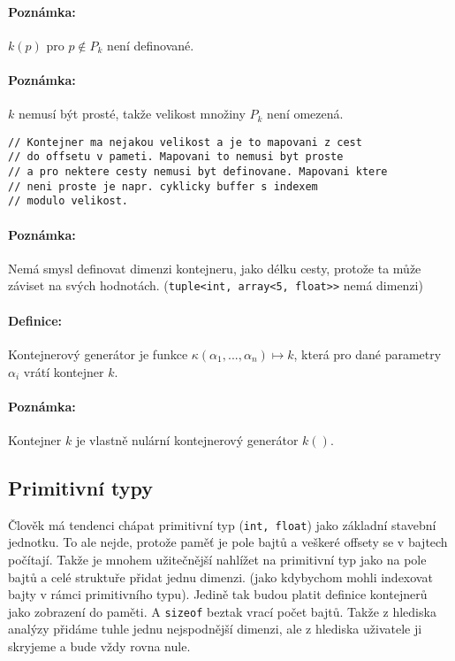 \documentclass[a4paper,12pt]{article}
\begin{document}
\paragraph{Poznámka:} $k(p)$ \qquad pro $p \notin P_k$ není definované.

\paragraph{Poznámka:} $k$ nemusí být prosté, takže velikost množiny $P_k$ není omezená.

\begin{lstlisting}
// Kontejner ma nejakou velikost a je to mapovani z cest
// do offsetu v pameti. Mapovani to nemusi byt proste
// a pro nektere cesty nemusi byt definovane. Mapovani ktere
// neni proste je napr. cyklicky buffer s indexem
// modulo velikost.
\end{lstlisting}

\paragraph{Poznámka:} Nemá smysl definovat dimenzi kontejneru, jako délku cesty, protože ta může záviset na svých hodnotách. (\lstinline{tuple<int, array<5, float>>} nemá dimenzi)

\paragraph{Definice:} Kontejnerový generátor je funkce $\kappa(\alpha_1, ..., \alpha_n) \mapsto k$, která pro dané parametry $\alpha_i$ vrátí kontejner $k$.

\paragraph{Poznámka:} Kontejner $k$ je vlastně nulární kontejnerový generátor $k()$.


\subsection{Primitivní typy}

Člověk má tendenci chápat primitivní typ (\lstinline{int, float}) jako základní stavební jednotku.
To ale nejde, protože paměť je pole bajtů a veškeré offsety se v bajtech počítají. Takže je mnohem
užitečnější nahlížet na primitivní typ jako na pole bajtů a celé struktuře přidat jednu dimenzi.
(jako kdybychom mohli indexovat bajty v rámci primitivního typu). Jedině tak budou platit definice
kontejnerů jako zobrazení do paměti. A \lstinline{sizeof} beztak vrací počet bajtů. Takže z hlediska
analýzy přidáme tuhle jednu nejspodnější dimenzi, ale z hlediska uživatele ji skryjeme a bude vždy
rovna nule.
\end{document}
